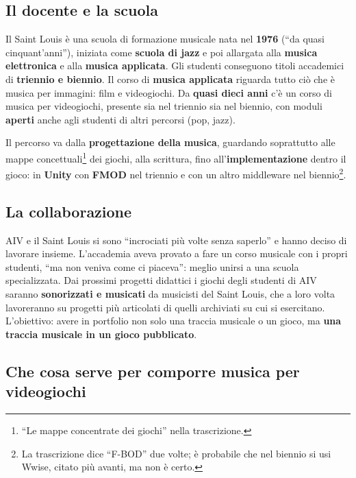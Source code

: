 \subsection{Il docente e la scuola}

Il Saint Louis è una scuola di formazione musicale nata nel \textbf{1976} (``da
quasi cinquant'anni''), iniziata come \textbf{scuola di jazz} e poi allargata alla
\textbf{musica elettronica} e alla \textbf{musica applicata}. Gli studenti
conseguono titoli accademici di \textbf{triennio e biennio}. Il corso di
\textbf{musica applicata} riguarda tutto ciò che è musica per immagini: film e
videogiochi. Da \textbf{quasi dieci anni} c'è un corso di musica per videogiochi,
presente sia nel triennio sia nel biennio, con moduli \textbf{aperti} anche agli
studenti di altri percorsi (pop, jazz).

Il percorso va dalla \textbf{progettazione della musica}, guardando soprattutto
alle mappe concettuali\footnote{``Le mappe concentrate dei giochi'' nella
trascrizione.} dei giochi, alla scrittura, fino all'\textbf{implementazione}
dentro il gioco: in \textbf{Unity} con \textbf{FMOD} nel triennio e con un altro
middleware nel biennio\footnote{La trascrizione dice ``F-BOD'' due volte; è
probabile che nel biennio si usi Wwise, citato più avanti, ma non è certo.}.

\subsection{La collaborazione}

AIV e il Saint Louis si sono ``incrociati più volte senza saperlo'' e hanno
deciso di lavorare insieme. L'accademia aveva provato a fare un corso musicale
con i propri studenti, ``ma non veniva come ci piaceva'': meglio unirsi a una
scuola specializzata. Dai prossimi progetti didattici i giochi degli studenti di
AIV saranno \textbf{sonorizzati e musicati} da musicisti del Saint Louis, che a
loro volta lavoreranno su progetti più articolati di quelli archiviati su cui si
esercitano. L'obiettivo: avere in portfolio non solo una traccia musicale o un
gioco, ma \textbf{una traccia musicale in un gioco pubblicato}.

\subsection{Che cosa serve per comporre musica per videogiochi}

